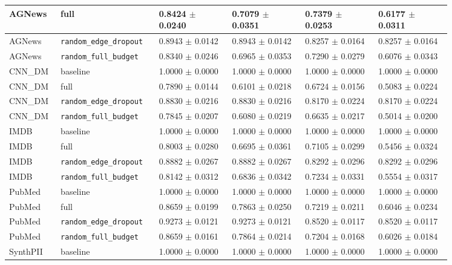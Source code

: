 \documentclass[preprint,12pt]{elsarticle}
\begin{document}
\begin{landscape}
\begin{longtable}{|L{0.08\linewidth}|L{0.17\linewidth}|C{0.15\linewidth}|C{0.15\linewidth}|C{0.15\linewidth}|C{0.15\linewidth}|}
AGNews & full & 0.8424 $\pm$ 0.0240 & 0.7079 $\pm$ 0.0351 & 0.7379 $\pm$ 0.0253 & 0.6177 $\pm$ 0.0311 \\ \hline
AGNews & \nolinkurl{random_edge_dropout} & 0.8943 $\pm$ 0.0142 & 0.8943 $\pm$ 0.0142 & 0.8257 $\pm$ 0.0164 & 0.8257 $\pm$ 0.0164 \\ \hline
AGNews & \nolinkurl{random_full_budget} & 0.8340 $\pm$ 0.0246 & 0.6965 $\pm$ 0.0353 & 0.7290 $\pm$ 0.0279 & 0.6076 $\pm$ 0.0343 \\ \hline
CNN\_DM & baseline & 1.0000 $\pm$ 0.0000 & 1.0000 $\pm$ 0.0000 & 1.0000 $\pm$ 0.0000 & 1.0000 $\pm$ 0.0000 \\ \hline
CNN\_DM & full & 0.7890 $\pm$ 0.0144 & 0.6101 $\pm$ 0.0218 & 0.6724 $\pm$ 0.0156 & 0.5083 $\pm$ 0.0224 \\ \hline
CNN\_DM & \nolinkurl{random_edge_dropout} & 0.8830 $\pm$ 0.0216 & 0.8830 $\pm$ 0.0216 & 0.8170 $\pm$ 0.0224 & 0.8170 $\pm$ 0.0224 \\ \hline
CNN\_DM & \nolinkurl{random_full_budget} & 0.7845 $\pm$ 0.0207 & 0.6080 $\pm$ 0.0219 & 0.6635 $\pm$ 0.0217 & 0.5014 $\pm$ 0.0200 \\ \hline
IMDB & baseline & 1.0000 $\pm$ 0.0000 & 1.0000 $\pm$ 0.0000 & 1.0000 $\pm$ 0.0000 & 1.0000 $\pm$ 0.0000 \\ \hline
IMDB & full & 0.8003 $\pm$ 0.0280 & 0.6695 $\pm$ 0.0361 & 0.7105 $\pm$ 0.0299 & 0.5456 $\pm$ 0.0324 \\ \hline
IMDB & \nolinkurl{random_edge_dropout} & 0.8882 $\pm$ 0.0267 & 0.8882 $\pm$ 0.0267 & 0.8292 $\pm$ 0.0296 & 0.8292 $\pm$ 0.0296 \\ \hline
IMDB & \nolinkurl{random_full_budget} & 0.8142 $\pm$ 0.0312 & 0.6836 $\pm$ 0.0342 & 0.7234 $\pm$ 0.0331 & 0.5554 $\pm$ 0.0317 \\ \hline
PubMed & baseline & 1.0000 $\pm$ 0.0000 & 1.0000 $\pm$ 0.0000 & 1.0000 $\pm$ 0.0000 & 1.0000 $\pm$ 0.0000 \\ \hline
PubMed & full & 0.8659 $\pm$ 0.0199 & 0.7863 $\pm$ 0.0250 & 0.7219 $\pm$ 0.0211 & 0.6046 $\pm$ 0.0234 \\ \hline
PubMed & \nolinkurl{random_edge_dropout} & 0.9273 $\pm$ 0.0121 & 0.9273 $\pm$ 0.0121 & 0.8520 $\pm$ 0.0117 & 0.8520 $\pm$ 0.0117 \\ \hline
PubMed & \nolinkurl{random_full_budget} & 0.8659 $\pm$ 0.0161 & 0.7864 $\pm$ 0.0214 & 0.7204 $\pm$ 0.0168 & 0.6026 $\pm$ 0.0184 \\ \hline
SynthPII & baseline & 1.0000 $\pm$ 0.0000 & 1.0000 $\pm$ 0.0000 & 1.0000 $\pm$ 0.0000 & 1.0000 $\pm$ 0.0000 \\ \hline

\end{longtable}
\end{landscape}
\end{document}
